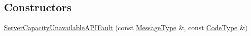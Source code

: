 \subsection*{Constructors}
\begin{DoxyCompactItemize}
\item 
\hypertarget{classopenstack_1_1xml_1_1ServerCapacityUnavailableAPIFault_a040238b60d1967436a0b72d336dd5bea}{
\hyperlink{classopenstack_1_1xml_1_1ServerCapacityUnavailableAPIFault_a040238b60d1967436a0b72d336dd5bea}{ServerCapacityUnavailableAPIFault} (const \hyperlink{classopenstack_1_1xml_1_1CloudServersAPIFault_aff7b9d2067747fa033a0ea4408011af6}{MessageType} \&, const \hyperlink{classopenstack_1_1xml_1_1CloudServersAPIFault_aa9f350c9dba08ae375b2a61568551550}{CodeType} \&)}
\label{classopenstack_1_1xml_1_1ServerCapacityUnavailableAPIFault_a040238b60d1967436a0b72d336dd5bea}


\end{DoxyCompactItemize}

